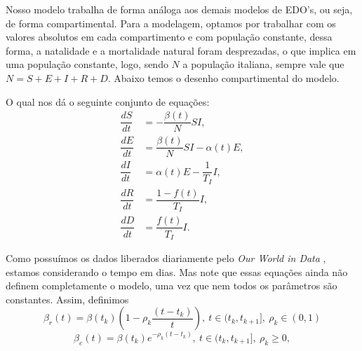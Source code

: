 \documentclass{article}
\begin{document}
Nosso modelo trabalha de forma análoga aos demais modelos de EDO's, ou seja, de forma compartimental. Para a modelagem, optamos por trabalhar com os valores absolutos em cada compartimento e com população constante, dessa forma, a natalidade e a mortalidade natural foram desprezadas, o que implica em uma população constante, logo, sendo $N$ a população italiana, sempre vale que $N = S + E + I + R + D$. Abaixo temos o desenho compartimental do modelo.
\begin{center}
\end{center}

O qual nos dá o seguinte conjunto de equações:
\begin{equation}
    \label{fSEIRD}
    \begin{split}
        \dfrac{dS}{dt} & = -\dfrac{\beta(t)}{N}SI, \\
        \dfrac{dE}{dt} & = \dfrac{\beta(t)}{N}SI - \alpha(t) E, \\
        \dfrac{dI}{dt} & = \alpha(t) E - \dfrac{1}{T_I}I, \\
        \dfrac{dR}{dt} & = \dfrac{1 - f(t)}{T_I}I, \\
        \dfrac{dD}{dt} & = \dfrac{f(t)}{T_I}I.
    \end{split}
\end{equation}

Como possuímos os dados liberados diariamente pelo \textit{Our World in Data} \cite{owid}, estamos considerando o tempo em dias. Mas note que essas equações ainda não definem completamente o modelo, uma vez que nem todos os parâmetros são constantes. Assim, definimos
\[\beta_r(t) = \beta(t_k)\left(1 - \rho_k\dfrac{(t - t_k)}{t}\right), ~t \in (t_k, t_{k + 1}], ~\rho_k \in (0, 1)\]
\[\beta_e(t) = \beta(t_k)e^{- \rho_k(t - t_k)}, ~t \in (t_k, t_{k + 1}], ~\rho_k \geq 0,\]
\end{document}
